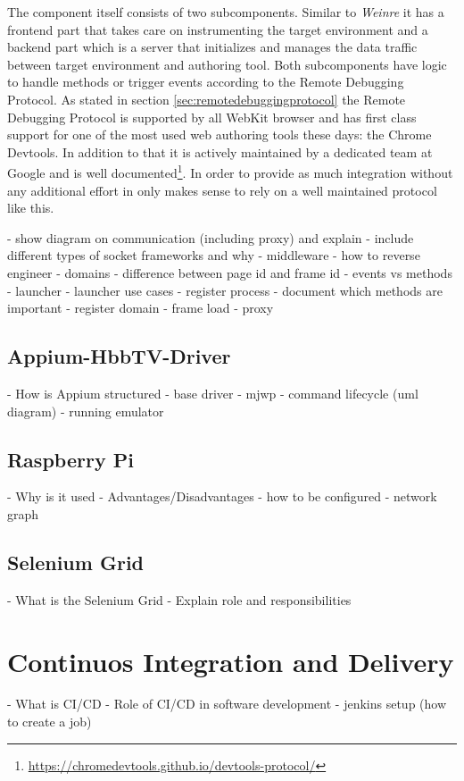 The component itself consists of two subcomponents. Similar to \textit{Weinre} it has a frontend
part that takes care on instrumenting the target environment and a backend part which is a server
that initializes and manages the data traffic between target environment and authoring tool. Both
subcomponents have logic to handle methods or trigger events according to the Remote Debugging
Protocol. As stated in section \ref{sec:remotedebuggingprotocol} the Remote Debugging Protocol is
supported by all WebKit browser and has first class support for one of the most used web authoring
tools these days: the Chrome Devtools. In addition to that it is actively maintained by a dedicated
team at Google and is well documented\footnote{\url{https://chromedevtools.github.io/devtools-protocol/}}.
In order to provide as much integration without any additional effort in only makes sense to rely on
a well maintained protocol like this.

- show diagram on communication (including proxy) and explain
    - include different types of socket frameworks and why
    - middleware
- how to reverse engineer
    - domains
    - difference between page id and frame id
    - events vs methods
- launcher
    - launcher use cases
    - register process
- document which methods are important
    - register domain
    - frame load
- proxy

\subsection{Appium-HbbTV-Driver\label{sec:appiumhbbtvdriver}}

- How is Appium structured
- base driver
- mjwp
- command lifecycle (uml diagram)
- running emulator

\subsection{Raspberry Pi\label{sec:pi}}

- Why is it used
- Advantages/Disadvantages
- how to be configured
- network graph

\subsection{Selenium Grid\label{sec:grid}}

- What is the Selenium Grid
- Explain role and responsibilities

\section{Continuos Integration and Delivery\label{sec:cicd}}

- What is CI/CD
- Role of CI/CD in software development
- jenkins setup (how to create a job)

